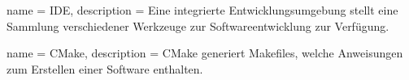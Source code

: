  {
    name = {IDE},
    description = {Eine integrierte Entwicklungsumgebung stellt eine Sammlung verschiedener Werkzeuge zur Softwareentwicklung zur Verfügung.}
}

 {
    name = {CMake},
    description = {CMake generiert Makefiles, welche Anweisungen zum Erstellen einer Software enthalten.}
}